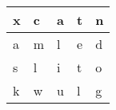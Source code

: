 \begin{table}[h]
\begin{tabular}{|l|l|l|l|l|}
\hline
x & c & a & t & n \\ \hline
a & m & l & e & d \\ \hline
s & l & i & t & o \\ \hline
k & w & u & l & g \\ \hline
\end{tabular}
\end{table}